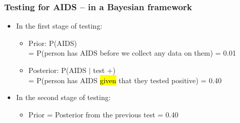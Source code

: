 \documentclass[11pt,containsverbatim,handout,xcolor=xelatex,dvipsnames,table]{beamer}
\newcommand{\soln}[1]{}
\begin{document}

\begin{frame}
\frametitle{Testing for AIDS --  in a Bayesian framework}

\begin{itemize}

\item In the first stage of testing:
\begin{itemize}
\item Prior: P(AIDS) \\ 
= P(person has AIDS before we collect any data on them) = 0.01
\item Posterior: P(AIDS $|$ test +) \\
= P(person has AIDS \hl{given} that they tested positive) = 0.40
\end{itemize}
\item In the second stage of testing:
\begin{itemize}
\item Prior = Posterior from the previous test = 0.40
\end{itemize}

\end{itemize}

\vfill



\soln{\pause{Higher, we're more likely to think that they have AIDS, compared to an average person from this population, since they tested positive once.}}


\end{frame}

\end{document}
